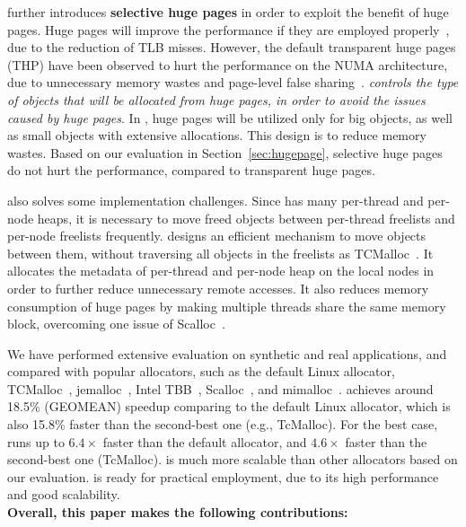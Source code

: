 \NM{} further introduces \textbf{selective huge pages} in order to exploit the benefit of huge pages. Huge pages will improve the performance if they are employed properly~\citep{DBLP:conf/asplos/MaasAIJMR20}, due to the reduction of TLB misses. However, the default transparent huge pages (THP) have been observed to hurt the performance on the NUMA architecture, due to unnecessary memory wastes and page-level false sharing~\citep{Gaud:2014:LPM:2643634.2643659, DBLP:conf/asplos/PanwarBG19, DBLP:conf/asplos/MaasAIJMR20}. \textit{\NM{} controls the type of objects that will be allocated from huge pages, in order to avoid the issues caused by huge pages}. In \NM{}, huge pages will be utilized only for big objects, as well as small objects with extensive allocations. This design is to reduce memory wastes. Based on our evaluation in Section~\ref{sec:hugepage}, \NM{} selective huge pages do not hurt the performance, compared to transparent huge pages.
 
\NM{} also solves some implementation challenges. Since \NM{} has many per-thread and per-node heaps, it is necessary to move freed objects between per-thread freelists and per-node freelists frequently. \NM{} designs an efficient mechanism to move objects between them, without traversing all objects in the freelists as TCMalloc~\citep{tcmalloc}. It allocates the metadata of per-thread and per-node heap on the local nodes in order to further reduce unnecessary remote accesses.  It also reduces memory consumption of huge pages by making multiple threads share the same memory block, overcoming one issue of Scalloc~\citep{Scalloc}. 

We have performed extensive evaluation on synthetic and real applications, and compared \NM{} with popular allocators, such as the default Linux allocator, TCMalloc~\citep{tcmalloc}, jemalloc~\citep{jemalloc}, Intel TBB~\citep{tbb}, Scalloc~\citep{Scalloc}, and mimalloc~\citep{mimalloc}. \NM{} achieves around 18.5\%  (GEOMEAN) speedup comparing to the default Linux allocator, which is also 15.8\% faster than the second-best one (e.g., TcMalloc). For the best case, \NM{} runs up to $6.4\times$ faster than the default allocator, and $4.6\times$ faster than the second-best one (TcMalloc). \NM{} is much more scalable than other allocators based on our evaluation. \NM{} is ready for practical employment, due to its high performance and good scalability. \\

\textbf{Overall, this paper makes the following contributions:} 

